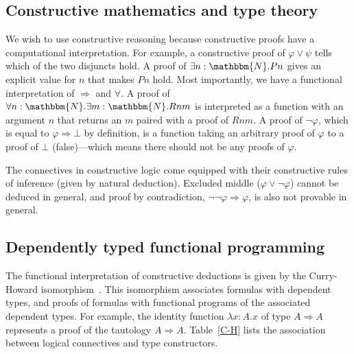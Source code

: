 \documentclass{elsarticle}
\newcommand{\emdash}{---}
\begin{document}
\subsection{\label{ss:constructiveMath}Constructive mathematics and type
theory}We wish to use constructive reasoning because constructive proofs have
a computational interpretation. For example, a constructive proof of $\varphi
\vee \psi$ tells which of the two disjuncts hold. A proof of $\exists n :
\mathbbm{N}. P n$ gives an explicit value for $n$ that makes $P n$ hold. Most
importantly, we have a functional interpretation of $\Rightarrow$ and
$\forall$. A proof of $\forall n : \mathbbm{N}. \exists m : \mathbbm{N}. R n
m$ is interpreted as a function with an argument $n$ that returns an $m$
paired with a proof of $R n m$. A proof of $\neg \varphi$, which is equal to
$\varphi \Rightarrow \bot$ by definition, is a function taking an arbitrary
proof of $\varphi$ to a proof of $\bot$ (false){\emdash}which means there
should not be any proofs of $\varphi$.

The connectives in constructive logic come equipped with their constructive
rules of inference (given by natural deduction){\cite{Sorensen}}. Excluded
middle ($\varphi \vee \neg \varphi$) cannot be deduced in general, and proof
by contradiction, $\neg \neg \varphi \Rightarrow \varphi$, is also not
provable in general.

\subsection{\label{ss:typeTheory}Dependently typed functional programming}The
functional interpretation of constructive deductions is given by the
Curry-Howard isomorphism~{\cite{Sorensen}}. This isomorphism associates
formulas with dependent types, and proofs of formulas with functional programs
of the associated dependent types. For example, the identity function $\lambda
x : A. x$ of type $A \Rightarrow A$ represents a proof of the tautology $A
\Rightarrow A$. Table~\ref{C-H} lists the association between logical
connectives and type constructors.
\end{document}
